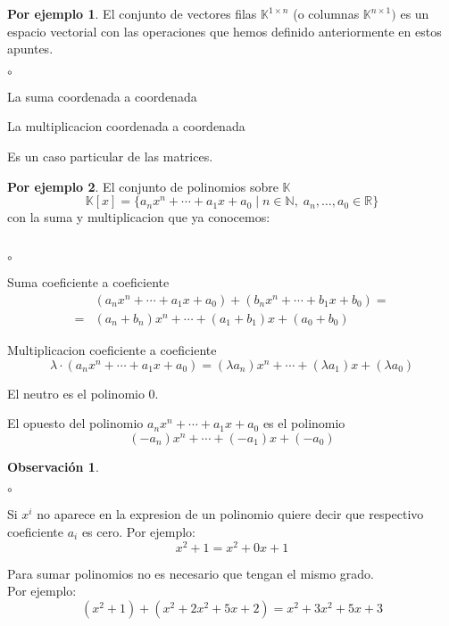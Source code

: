 \documentclass{article}
\theoremstyle{definition}
\theoremstyle{definition}
\newtheorem*{obs}{Observación}
\newtheorem*{ej}{Por ejemplo}
\theoremstyle{remark}
\begin{document}
\begin{ej}
  El conjunto de vectores filas $\mathbb{K}^{1 \times n}$ (o columnas $\mathbb{K}^{n \times 1})$ es un espacio vectorial con las operaciones que hemos definido anteriormente en estos apuntes. 
\begin{list}{$\circ$}{}  
\item  La suma coordenada a coordenada 
\item La multiplicacion coordenada a coordenada
\end{list}
Es un caso particular de las matrices.
\end{ej}
\pagebreak

\begin{ej}
  El conjunto de polinomios sobre $\mathbb{K}$ \[
  \mathbb{K}[x]=\{a_nx^n+ \cdots + a_1 x + a_0 \; | \; n \in \mathbb{N},\; a_{n}, \dots ,a_{0}\in \mathbb{R}\}
  \]
   con la suma y multiplicacion que ya conocemos: 
   \\\\
\begin{list}{$\circ$}{}  
\item  Suma coeficiente a coeficiente \[
    \begin{aligned}
    &(a_nx^n+\cdots +a_1x+a_0)+(b_nx^n+\cdots + b_1x+b_0)=
    \\
    = &(a_n+b_n)x^n+\cdots + (a_1+b_1)x+(a_0+b_0)
  \end{aligned}
  \]
\item Multiplicacion coeficiente a coeficiente \[
\lambda \cdot (a_nx^n+\cdots + a_1 x + a_0) = (\lambda a_n)x^n+\cdots + (\lambda a_1 ) x + (\lambda a_0)
  \]
\item El neutro es el polinomio $0$.
\item El opuesto del polinomio $a_nx^n+\cdots + a_1 x + a_0$ es el polinomio $$(-a_n)x^n+\cdots + (-a_1) x + (-a_0)$$
\end{list}
\end{ej}
\begin{obs}\;
\begin{list}{$\circ$}{}  
\item  Si $x^i$ no aparece en la expresion de un polinomio quiere decir que respectivo coeficiente $a_i$ es cero. Por ejemplo: \[
x^2+1=x^2+0x+1
  \]
\item Para sumar polinomios no es necesario que tengan el mismo grado.\\ Por ejemplo: \[
    (x^2+1)+(x^2+2x^2+5x+2)=x^2+3x^2+5x+3
  \]
\end{list}
\end{obs}
\pagebreak
\end{document}
